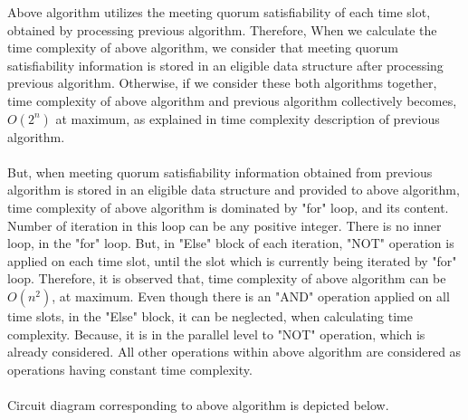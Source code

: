 Above algorithm utilizes the meeting quorum satisfiability of each time slot, obtained by processing previous algorithm. Therefore, When we calculate the time complexity of above algorithm, we consider that meeting quorum satisfiability information is stored in an eligible data structure after processing previous algorithm. Otherwise, if we consider these both algorithms together, time complexity of above algorithm and previous algorithm collectively becomes, $O(2^{n})$ at maximum, as explained in time complexity description of previous algorithm.\\ \\
But, when meeting quorum satisfiability information obtained from previous algorithm is stored in an eligible data structure and provided to above algorithm, time complexity of above algorithm is dominated by "for" loop, and its content. Number of iteration in this loop can be any positive integer. There is no inner loop, in the "for" loop. But, in "Else" block of each iteration, "NOT" operation is applied on each time slot, until the slot which is currently being iterated by "for" loop. Therefore, it is observed that, time complexity of above algorithm can be $O(n^{2})$, at maximum. Even though there is an "AND" operation applied on all time slots, in the "Else" block, it can be neglected, when calculating time complexity. Because, it is in the parallel level to "NOT" operation, which is already considered. All other operations within above algorithm are considered as operations having constant time complexity.\\ \\
Circuit diagram corresponding to above algorithm is depicted below.\\ \\

